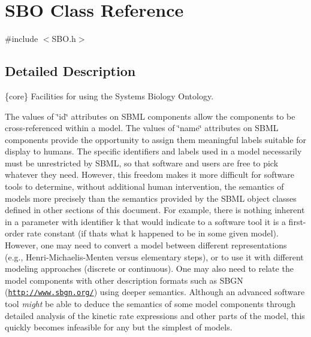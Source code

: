 \hypertarget{class_s_b_o}{}\section{S\+BO Class Reference}
\label{class_s_b_o}


{\ttfamily \#include $<$S\+B\+O.\+h$>$}



\subsection{Detailed Description}
\{core\} Facilities for using the Systems Biology Ontology.



The values of \char`\"{}id\char`\"{} attributes on S\+B\+ML components allow the components to be cross-\/referenced within a model. The values of \char`\"{}name\char`\"{} attributes on S\+B\+ML components provide the opportunity to assign them meaningful labels suitable for display to humans. The specific identifiers and labels used in a model necessarily must be unrestricted by S\+B\+ML, so that software and users are free to pick whatever they need. However, this freedom makes it more difficult for software tools to determine, without additional human intervention, the semantics of models more precisely than the semantics provided by the S\+B\+ML object classes defined in other sections of this document. For example, there is nothing inherent in a parameter with identifier {\ttfamily k} that would indicate to a software tool it is a first-\/order rate constant (if that\textquotesingle{}s what {\ttfamily k} happened to be in some given model). However, one may need to convert a model between different representations (e.\+g., Henri-\/\+Michaelis-\/\+Menten versus elementary steps), or to use it with different modeling approaches (discrete or continuous). One may also need to relate the model components with other description formats such as S\+B\+GN (\href{http://www.sbgn.org/}{\tt http\+://www.\+sbgn.\+org/}) using deeper semantics. Although an advanced software tool {\itshape might} be able to deduce the semantics of some model components through detailed analysis of the kinetic rate expressions and other parts of the model, this quickly becomes infeasible for any but the simplest of models.

